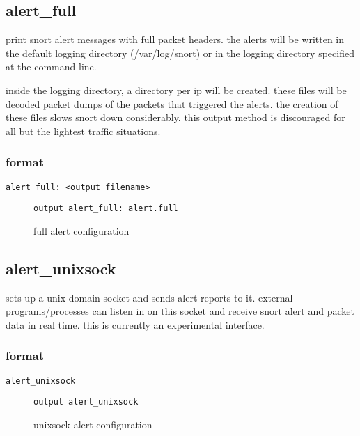 \documentclass[english]{report}
\begin{document}
\subsection{alert\_full}

print snort alert messages with full packet headers. the alerts will
be written in the default logging directory (/var/log/snort) or in
the logging directory specified at the command line.

inside the logging directory, a directory per ip will be created.
these files will be decoded packet dumps of the packets that triggered
the alerts. the creation of these files slows snort down considerably.
this output method is discouraged for all but the lightest traffic
situations.


\subsubsection{format}

\begin{verbatim}
alert_full: <output filename>
\end{verbatim}
%
\begin{figure}[!hbpt]
\begin{verbatim}
output alert_full: alert.full
\end{verbatim}

\caption{\label{full alert configuration}full alert configuration}
\end{figure}


\subsection{alert\_unixsock}

sets up a unix domain socket and sends alert reports to it. external
programs/processes can listen in on this socket and receive snort
alert and packet data in real time. this is currently an experimental
interface.


\subsubsection{format}

\begin{verbatim}
alert_unixsock
\end{verbatim}
%
\begin{figure}[!hbpt]
\begin{verbatim}
output alert_unixsock
\end{verbatim}

\caption{\label{unixsock configuration}unixsock alert configuration}
\end{figure}
\end{document}
